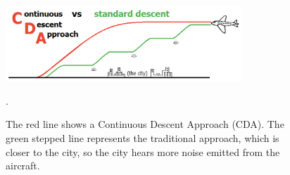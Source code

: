 \documentclass[journal]{IEEEtran}
\newcommand{\ADD}[1]{#1}
\begin{document}


\begin{figure}[!t]
  \centering
  \includegraphics[width=3.5in]{figures/cda_diagram.png}
  \caption[Continuous Descent Approach]{
The red line shows a Continuous Descent Approach (CDA).
The green stepped line represents the
traditional approach, which is closer to the city,
so the city hears more noise emitted from the
aircraft.}.

  \label{fig:cda_diagram}
\end{figure}
\end{document}
